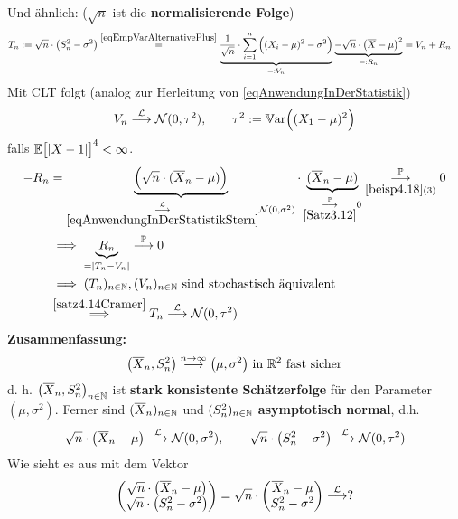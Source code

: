 Und ähnlich: ($\sqrt{n}$ ist die \textbf{normalisierende Folge})
\begin{align*}
	T_n&:=\sqrt{n}\cdot\left(S_n^2-\sigma^2\right)
	\overset{\eqref{eqEmpVarAlternativePlus}}{=}
	\underbrace{\frac{1}{\sqrt{n}}\cdot\sum\limits_{i=1}^n\Big((X_i-\mu)^2-\sigma^2\Big)}_{=:V_n}\underbrace{-\sqrt{n}\cdot\big(\overline{X}-\mu\big)^2}_{=:R_n}
	=V_n+R_n
\end{align*}
Mit CLT folgt (analog zur Herleitung von \eqref{eqAnwendungInDerStatistik})
\begin{align*}
	V_n\stackrel{\mathcal{L}}{\longrightarrow}\mathcal{N}(0,\tau^2),\qquad\tau^2:=\mathbb{V}\text{ar}\Big((X_1-\mu)^2\Big)
\end{align*}
falls $\mathbb{E}\big[|X-1|\big]^4<\infty$.
\begin{align*}
	-R_n&=\underbrace{\Big(\sqrt{n}\cdot(\overline{X}_n-\mu)\Big)}_{\underset{\eqref{eqAnwendungInDerStatistikStern}}{\overset{\mathcal{L}}{\longrightarrow}}\mathcal{N}(0,\sigma^2)}\cdot\underbrace{(\overline{X}_n-\mu)}_{\underset{\ref{Satz3.12}}{\overset{\mathbb{P}}{\longrightarrow}}0}\underset{\ref{beisp4.18}(3)}{\overset{\mathbb{P}}{\longrightarrow}}0\\
	&\implies \underbrace{R_n}_{=|T_n-V_n|}\stackrel{\mathbb{P}}{\longrightarrow}0\\
	&\implies(T_n)_{n\in\mathbb{N}},(V_n)_{n\in\mathbb{N}}\text{ sind stochastisch äquivalent}\\
	&\stackrel{\ref{satz4.14Cramer}}{\implies}
	T_n\stackrel{\mathcal{L}}{\longrightarrow}\mathcal{N}(0,\tau^2)
\end{align*}
\textbf{Zusammenfassung:}
\begin{align*}
	\big(\overline{X}_n,S_n^2\big)\stackrel{n\to\infty}{\longrightarrow}\big(\mu,\sigma^2\big)\text{ in }\mathbb{R}^2\text{ fast sicher}
\end{align*}
d. h. $\big(\overline{X}_n,S_n^2\big)_{n\in\mathbb{N}}$ ist \textbf{stark konsistente Schätzerfolge} für den Parameter $(\mu,\sigma^2)$.
Ferner sind $(\overline{X}_n)_{n\in\mathbb{N}}$ und $(S_n^2)_{n\in\mathbb{N}}$ \textbf{asymptotisch normal}, d.h.
\begin{align*}
	\sqrt{n}\cdot\big(\overline{X}_n-\mu\big)\stackrel{\mathcal{L}}{\longrightarrow}\mathcal{N}(0,\sigma^2),\qquad
	\sqrt{n}\cdot\big(S_n^2-\sigma^2\big)\stackrel{\mathcal{L}}{\longrightarrow}\mathcal{N}(0,\tau^2)
\end{align*}
Wie sieht es aus mit dem Vektor 
\begin{align*}
	\begin{pmatrix}
		\sqrt{n}\cdot\big(\overline{X}_n-\mu\big)\\
		\sqrt{n}\cdot\big(S_n^2-\sigma^2\big)
	\end{pmatrix}
	=\sqrt{n}\cdot\begin{pmatrix}
		\overline{X}_n-\mu\\
		S_n^2-\sigma^2
	\end{pmatrix}
	\stackrel{\mathcal{L}}{\longrightarrow}?
\end{align*}